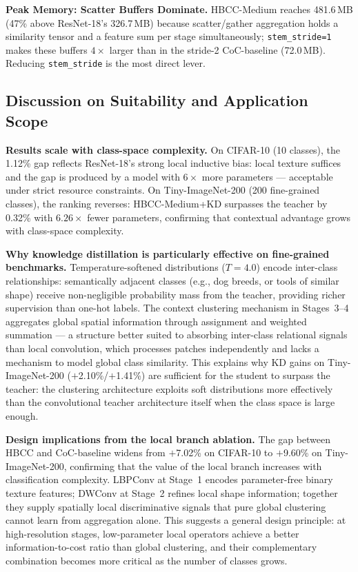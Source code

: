 \documentclass[conference]{IEEEtran}
\begin{document}
\noindent\textbf{Peak Memory: Scatter Buffers Dominate.}
HBCC-Medium reaches 481.6\,MB (47\% above ResNet-18's 326.7\,MB)
because scatter/gather aggregation holds a similarity tensor and a
feature sum per stage simultaneously; \texttt{stem\_stride=1} makes
these buffers $4\!\times$ larger than in the stride-2 CoC-baseline
(72.0\,MB). Reducing \texttt{stem\_stride} is the most direct lever.

\subsection{Discussion on Suitability and Application Scope}
\label{sec:discussion}

\textbf{Results scale with class-space complexity.}
On CIFAR-10 (10 classes), the 1.12\% gap reflects ResNet-18's strong
local inductive bias: local texture suffices and the gap is produced
by a model with $6\times$ more parameters --- acceptable under strict
resource constraints. On Tiny-ImageNet-200 (200 fine-grained classes),
the ranking reverses: HBCC-Medium+KD surpasses the teacher by 0.32\%
with $6.26\times$ fewer parameters, confirming that contextual
advantage grows with class-space complexity.

\textbf{Why knowledge distillation is particularly effective on
fine-grained benchmarks.}
Temperature-softened distributions ($T{=}4.0$) encode inter-class
relationships: semantically adjacent classes (e.g., dog breeds, or
tools of similar shape) receive non-negligible probability mass from
the teacher, providing richer supervision than one-hot labels. The
context clustering mechanism in Stages~3--4 aggregates global spatial
information through assignment and weighted summation --- a structure
better suited to absorbing inter-class relational signals than local
convolution, which processes patches independently and lacks a
mechanism to model global class similarity. This explains why KD
gains on Tiny-ImageNet-200 ($+$2.10\%/$+$1.41\%) are sufficient for
the student to surpass the teacher: the clustering architecture
exploits soft distributions more effectively than the convolutional
teacher architecture itself when the class space is large enough.

\textbf{Design implications from the local branch ablation.}
The gap between HBCC and CoC-baseline widens from $+$7.02\% on
CIFAR-10 to $+$9.60\% on Tiny-ImageNet-200, confirming that the value
of the local branch increases with classification complexity.
LBPConv at Stage~1 encodes parameter-free binary texture features;
DWConv at Stage~2 refines local shape information; together they
supply spatially local discriminative signals that pure global
clustering cannot learn from aggregation alone. This suggests a
general design principle: at high-resolution stages, low-parameter
local operators achieve a better information-to-cost ratio than
global clustering, and their complementary combination becomes more
critical as the number of classes grows.
\end{document}
